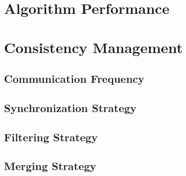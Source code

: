 \section{Algorithm Performance}

\section{Consistency Management}
\subsection{Communication Frequency}

\subsection{Synchronization Strategy}

\subsection{Filtering Strategy}

\subsection{Merging Strategy}
